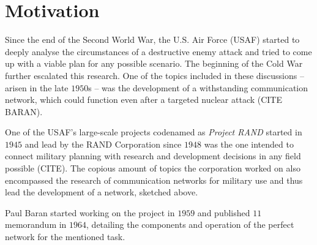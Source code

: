 \section{Motivation}
Since the end of the Second World War, the U.S. Air Force (USAF) started to deeply analyse the circumstances of a destructive enemy attack and tried to come up with a viable plan for any possible scenario. The beginning of the Cold War further escalated this research. One of the topics included in these discussions -- arisen in the late $1950$s -- was the development of a withstanding communication network, which could function even after a targeted nuclear attack (CITE BARAN).

One of the USAF's large-scale projects codenamed as \textit{Project RAND} started in $1945$ and lead by the RAND Corporation since $1948$ was the one intended to connect military planning with research and development decisions in any field possible (CITE). The copious amount of topics the corporation worked on also encompassed the research of communication networks for military use and thus lead the development of a  network, sketched above.

Paul Baran started working on the project in $1959$ and published $11$ memorandum in $1964$, detailing the components and operation of the perfect network for the mentioned task.